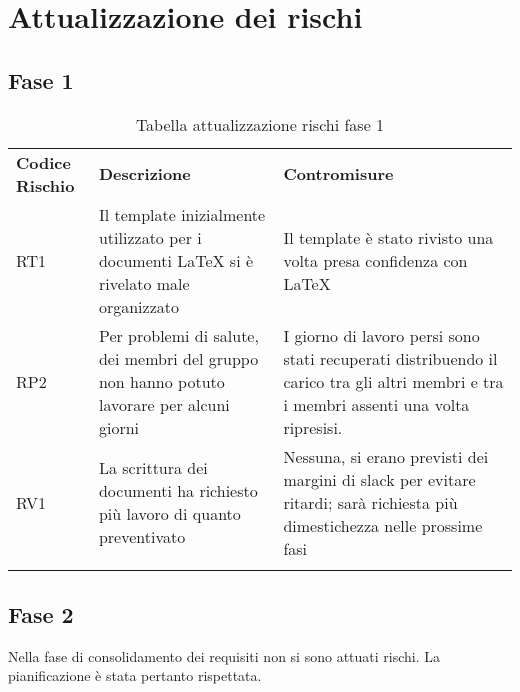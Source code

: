 \section{Attualizzazione dei rischi}
\label{sec:attualizzazione_rischi}
\subsection{Fase 1}
\label{sec:fase_1}
\begin{center}

\renewcommand{\arraystretch}{1.5}
	\begin{longtable}[H]{  	>{\Centering}p{2cm}	
							>{\RaggedRight}p{6cm}	
							>{\RaggedRight}p{6cm}  
							}
							
		\rowcolor{tableHeadYellow}
		\textbf{Codice Rischio}   & \textbf{Descrizione} & \textbf{Contromisure}\\ 

		RT1	&Il template inizialmente utilizzato per i documenti LaTeX si è rivelato male organizzato	&Il template è stato rivisto una volta presa confidenza con LaTeX\\
		RP2	&Per problemi di salute, dei membri del gruppo non hanno potuto lavorare per alcuni giorni	&I giorno di lavoro persi sono stati recuperati distribuendo il carico tra gli altri membri e tra i membri assenti una volta ripresisi.\\
		RV1	&La scrittura dei documenti ha richiesto più lavoro di quanto preventivato	&Nessuna, si erano previsti dei margini di slack per evitare ritardi; sarà richiesta più dimestichezza nelle prossime fasi\\

		\rowcolor{white}
		\caption{Tabella attualizzazione rischi fase 1}
	\end{longtable}
\end{center}

\subsection{Fase 2}
\label{sec:fase_2}
\begin{center}
Nella fase di consolidamento dei requisiti non si sono attuati rischi.  \newline
La pianificazione è stata pertanto rispettata.
\end{center}

